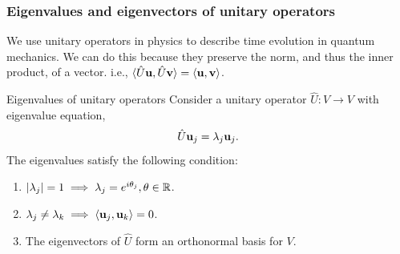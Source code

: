 \documentclass{book}
\def\innerproduct#1#2{{\langle #1},{#2 \rangle}}
\begin{document}
\subsubsection{Eigenvalues and eigenvectors of unitary operators}
We use unitary operators in physics to describe time evolution in quantum mechanics. We can do this because they preserve the norm, and thus the inner product, of a vector. i.e., $\innerproduct{\hat{U}\vb{u}}{\hat{U}\vb{v}} = \innerproduct{\vb{u}}{\vb{v}}$.
\begin{Theorems}{Eigenvalues of unitary operators}{}
	Consider a unitary operator $\hat{U} : V \to V$ with eigenvalue equation,
	\begin{equation}
		\hat{U}\vb{u}_j = \lambda_j\vb{u}_j.
	\end{equation}
	The eigenvalues satisfy the following condition:
	\begin{enumerate}
		\item $\abs{\lambda_j} = 1 \implies \lambda_j = e^{i\theta_j}, \theta \in \mathbb{R}$.
		\item $\lambda_j \neq \lambda_k \implies \innerproduct{\vb{u}_j}{\vb{u}_k} = 0$.
		\item The eigenvectors of $\hat{U}$ form an orthonormal basis for $V$.
	\end{enumerate}
\end{Theorems}
\end{document}
